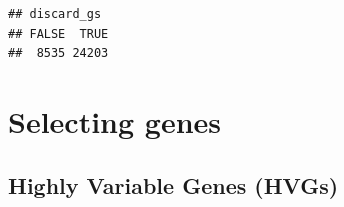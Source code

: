 \documentclass[
]{book}
\newenvironment{Shaded}{\begin{snugshade}}{\end{snugshade}}
\newcommand{\DocumentationTok}[1]{\textcolor[rgb]{0.56,0.35,0.01}{\textbf{\textit{#1}}}}
\newcommand{\FunctionTok}[1]{\textcolor[rgb]{0.13,0.29,0.53}{\textbf{#1}}}
\newcommand{\NormalTok}[1]{#1}
\newcommand{\OtherTok}[1]{\textcolor[rgb]{0.56,0.35,0.01}{#1}}
\newcommand{\SpecialCharTok}[1]{\textcolor[rgb]{0.81,0.36,0.00}{\textbf{#1}}}
\begin{document}
\begin{verbatim}
## discard_gs
## FALSE  TRUE 
##  8535 24203
\end{verbatim}

\begin{Shaded}
\end{Shaded}

\hypertarget{selecting-genes-1}{%
\section{Selecting genes}\label{selecting-genes-1}}

\hypertarget{highly-variable-genes-hvgs-1}{%
\subsection{Highly Variable Genes (HVGs)}\label{highly-variable-genes-hvgs-1}}
\end{document}
